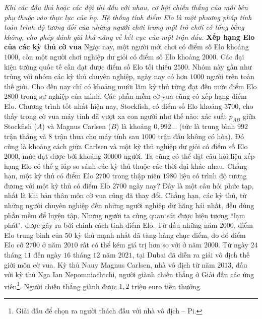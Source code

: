\vspace*{200pt}

\begin{multicols}{2}
	\textit{Khi các đấu thủ hoặc các đội thi đấu với nhau, cơ hội chiến thắng của mỗi bên phụ thuộc vào thực lực của họ. Hệ thống tính điểm Elo là một phương pháp tính toán trình độ tương đối của những người chơi trong một trò chơi có tổng bằng không, cho phép đánh giá khả năng về kết cục của một trận đấu.}
	\vskip 0.05cm
	\textbf{\color{toanhocdoisong}Xếp hạng Elo của các kỳ thủ cờ vua}
	\vskip 0.05cm
	Ngày nay, một người mới chơi có điểm số Elo khoảng $1000$, còn một người chơi nghiệp dư giỏi có điểm số Elo khoảng $2000$. Các đại kiện tướng quốc tế cần đạt được điểm số Elo tối thiểu $2500$. Nhóm này gần như trùng với nhóm các kỳ thủ chuyên nghiệp, ngày nay có hơn $1000$ người trên toàn thế giới. Cho đến nay chỉ có khoảng mười lăm kỳ thủ từng đạt đến mức điểm Elo $2800$ trong sự nghiệp của mình.
	\vskip 0.05cm
	Các phần mềm cờ vua cũng có xếp hạng điểm Elo. Chương trình tốt nhất hiện nay, Stockfish, có điểm số Elo khoảng $3700$, cho thấy trong cờ vua máy tính đã vượt xa con người như thế nào: xác suất $p_{AB}$ giữa Stockfish ($A$) và Magnus Carlsen ($B$) là khoảng $0{,}992\ldots$ (tức là trung bình $992$ trận thắng và $8$ trận thua cho máy tính sau $1000$ trận đấu không có hòa). Đó cũng là khoảng cách giữa Carlsen và một kỳ thủ nghiệp dư giỏi có điểm số Elo $2000$, mức đạt được bởi khoảng $30000$ người.
	\vskip 0.05cm
	Ta cũng có thể đặt câu hỏi liệu xếp hạng Elo có thể g  iúp so sánh các kỳ thủ thuộc các thời đại khác nhau. Chẳng hạn, một kỳ thủ có điểm Elo $2700$ trong thập niên $1980$ liệu có trình độ tương đương với một kỳ thủ có điểm Elo $2700$ ngày nay? Đây là một câu hỏi phức tạp, nhất là khi bản thân môn cờ vua cũng đã thay đổi. Chẳng hạn, các kỳ thủ, từ những người chuyên nghiệp đến những người nghiệp dư hăng hái nhất, đều dùng phần mềm để luyện tập. Nhưng người ta cũng quan sát được hiện tượng ``lạm phát", được gây ra bởi chính cách tính điểm Elo. Từ đầu những năm $2000$, điểm Elo trung bình của $50$ kỳ thủ mạnh nhất đã tăng hàng chục điểm, do đó điểm Elo cỡ $2700$ ở năm $2010$ rất có thể kém giá trị hơn so với ở năm $2000$.
	\vskip 0.05cm
	Từ ngày $24$ tháng $11$ đến ngày $16$ tháng $12$ năm $2021$, tại Dubai đã diễn ra giải vô địch thế giới môn cờ vua. Kỳ thủ Nauy Magnus Carlsen, nhà vô địch từ năm $2013$, đấu với kỳ thủ Nga Ian Nepomniachtchi, người giành chiến thắng ở Giải đấu các ứng viên\footnote[3]{\color{toanhocdoisong}Giải đấu để chọn ra người thách đấu với nhà vô địch -- Pi.}. Người chiến thắng giành được $1{,}2$ triệu euro tiền thưởng.

\end{multicols}

